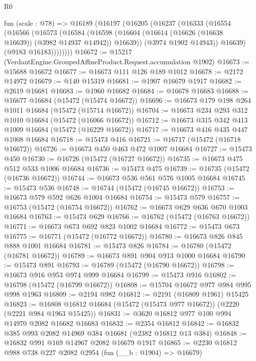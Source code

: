 \begin{lexlean}{R0}
\begin{coremodule}
    fun (scale : @78) =>
    @16189
      (@16197
        (@16205
          (@16237
            (@16333
              (@16554
                (@16566
                  (@16573
                    (@16584
                      (@16598
                        (@16604 (@16614 (@16626 (@16638 @16639)) (@3982 @14937 @14942)) @16639))
                      (@3974 @1902 @14943))
                    @16639)
                  (@9183 @16183))))))))
@16672 := @15217 (VerdantEngine.GroupedAffineProduct.Request.accumulation @1902)
@16673 := @15688 @16672
@16677 := @16673 @111 @126 @189 @1012
@16678 := @2172 @14972
@16679 := @140 @15319
@16681 := @1907 @16679 @1917
@16682 := @2619 @16681
@16683 := @1960 @16682
@16684 := @16678 @16683
@16688 := @16677 @16684 (@15472 (@15474 @16672))
@16696 := @16673 @179 @198 @264 @1011 @16684 (@15472 (@15714 @16672))
@16704 := @16673 @234 @293 @312 @1010 @16684 (@15472 (@16066 @16672))
@16712 := @16673 @315 @342 @413 @1009 @16684 (@15472 (@16229 @16672))
@16717 := @16673 @416 @435 @447 @1008 @16684
@16718 := @15473 @416
@16721 := @16717 (@15472 (@16718 @16672))
@16726 := @16673 @450 @463 @472 @1007 @16684
@16727 := @15473 @450
@16730 := @16726 (@15472 (@16727 @16672))
@16735 := @16673 @475 @512 @533 @1006 @16684
@16736 := @15473 @475
@16739 := @16735 (@15472 (@16736 @16672))
@16744 := @16673 @536 @561 @576 @1005 @16684
@16745 := @15473 @536
@16748 := @16744 (@15472 (@16745 @16672))
@16753 := @16673 @579 @592 @626 @1004 @16684
@16754 := @15473 @579
@16757 := @16753 (@15472 (@16754 @16672))
@16762 := @16673 @629 @636 @670 @1003 @16684
@16763 := @15473 @629
@16766 := @16762 (@15472 (@16763 @16672))
@16771 := @16673 @673 @692 @823 @1002 @16684
@16772 := @15473 @673
@16775 := @16771 (@15472 (@16772 @16672))
@16780 := @16673 @826 @845 @888 @1001 @16684
@16781 := @15473 @826
@16784 := @16780 (@15472 (@16781 @16672))
@16789 := @16673 @891 @904 @913 @1000 @16684
@16790 := @15473 @891
@16793 := @16789 (@15472 (@16790 @16672))
@16798 := @16673 @916 @953 @974 @999 @16684
@16799 := @15473 @916
@16802 := @16798 (@15472 (@16799 @16672))
@16808 := @15704 @16672 @977 @984 @995 @998 @1963
@16809 := @2194 @982
@16812 := @2191 (@16809 @1961) @15425
@16823 := @16808 @16812 @16684 (@15472 (@15473 @977 @16672)) (@2220 (@2221 @984 @1963 @15425))
@16831 := @3620 @16812 @977 @100 @994 @14970 @2082 @16682 @16683
@16832 := @2354 @16812
@16842 := @16832 @385 @993 @2082 @14969 @384 @16681 (@2382 @16812 @13 @384)
@16848 := @16832 @991 @169 @14967 @2082 @16679 @1917
@16865 := @2230
    @16812
    @988
    @738
    @227
    @2082
    @2954
    (fun (__b : @1904) => @16679)

\end{coremodule}
\end{lexlean}
